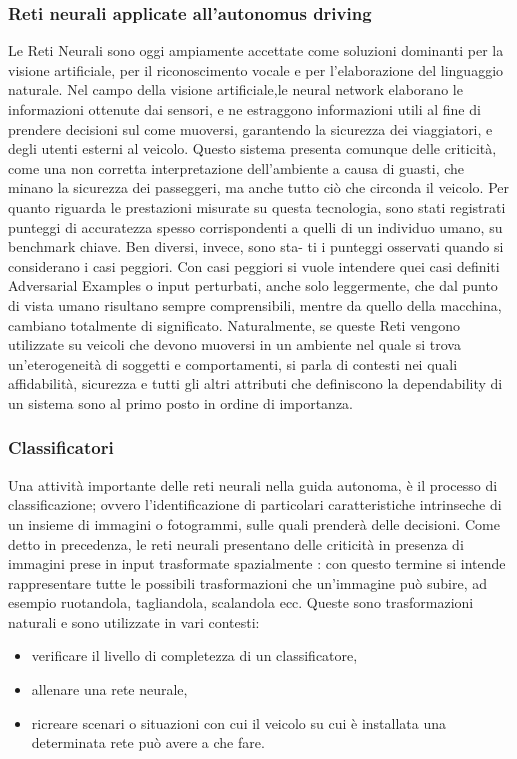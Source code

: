 \documentclass[14pt]{extarticle}
\begin{document}
\subsubsection{Reti neurali applicate all'autonomus driving}
Le Reti Neurali sono oggi ampiamente accettate come soluzioni dominanti per la visione artificiale, per il riconoscimento vocale e per l'elaborazione del linguaggio naturale. Nel campo della visione artificiale,le neural network elaborano le informazioni ottenute dai sensori, e ne estraggono informazioni utili al fine di prendere decisioni sul come muoversi, garantendo la sicurezza dei viaggiatori, e degli utenti esterni al veicolo. 
Questo sistema presenta comunque delle criticità, come una non corretta interpretazione dell'ambiente a causa di guasti, che minano la sicurezza dei passeggeri, ma anche tutto ciò che circonda il veicolo.%
Per quanto riguarda le prestazioni misurate su questa tecnologia, sono stati
registrati punteggi di accuratezza spesso corrispondenti a quelli di un
individuo umano, su benchmark chiave. Ben diversi, invece, sono sta-
ti i punteggi osservati quando si considerano i casi peggiori. Con casi
peggiori si vuole intendere quei casi definiti Adversarial Examples \cite{engstrom2019exploring} o
input perturbati, anche solo leggermente, che dal punto di vista umano
risultano sempre comprensibili, mentre da quello della macchina, cambiano totalmente di significato. Naturalmente, se queste Reti vengono
utilizzate su veicoli che devono muoversi in un ambiente nel quale si
trova un'eterogeneità di soggetti e comportamenti, si parla di contesti
nei quali affidabilità, sicurezza e tutti gli altri attributi che definiscono la
dependability di un sistema sono al primo posto in ordine di importanza.

\subsubsection{Classificatori}
Una attività importante delle reti neurali nella guida autonoma, è il processo di classificazione; ovvero l'identificazione di particolari caratteristiche  intrinseche di un insieme di immagini o fotogrammi, sulle quali prenderà delle decisioni.
Come detto in precedenza, le reti neurali presentano delle criticità in presenza di immagini prese in input trasformate spazialmente \cite{engstrom2019exploring}: con
questo termine si intende rappresentare tutte le possibili trasformazioni
che un'immagine può subire, ad esempio ruotandola, tagliandola, scalandola ecc. Queste sono trasformazioni naturali e sono utilizzate in vari
contesti:
\begin{itemize}
\item verificare il livello di completezza di un classificatore,
\item allenare una rete neurale,
\item ricreare scenari o situazioni con cui il veicolo su cui è installata una
determinata rete può avere a che fare.
\end{itemize}
\end{document}

